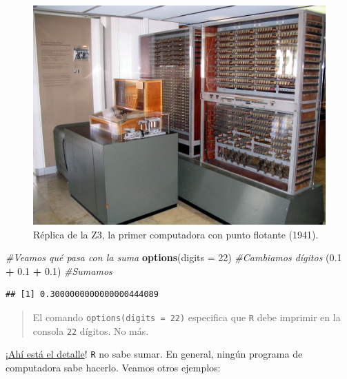 \documentclass[
]{book}
\newenvironment{Shaded}{\begin{snugshade}}{\end{snugshade}}
\newcommand{\CommentTok}[1]{\textcolor[rgb]{0.56,0.35,0.01}{\textit{#1}}}
\newcommand{\DataTypeTok}[1]{\textcolor[rgb]{0.13,0.29,0.53}{#1}}
\newcommand{\DecValTok}[1]{\textcolor[rgb]{0.00,0.00,0.81}{#1}}
\newcommand{\FloatTok}[1]{\textcolor[rgb]{0.00,0.00,0.81}{#1}}
\newcommand{\KeywordTok}[1]{\textcolor[rgb]{0.13,0.29,0.53}{\textbf{#1}}}
\newcommand{\NormalTok}[1]{#1}
\newcommand{\OperatorTok}[1]{\textcolor[rgb]{0.81,0.36,0.00}{\textbf{#1}}}
\newcommand{\StringTok}[1]{\textcolor[rgb]{0.31,0.60,0.02}{#1}}
\begin{document}
\begin{figure}

{\centering \includegraphics[width=22.22in]{images/Z3_Deutsches_Museum} 

}

\caption{Réplica de la Z3, la primer computadora con punto flotante (1941).}\label{fig:unnamed-chunk-58}
\end{figure}

\begin{Shaded}
\begin{Highlighting}[]
\CommentTok{#Veamos qué pasa con la suma}
\KeywordTok{options}\NormalTok{(}\DataTypeTok{digits =} \DecValTok{22}\NormalTok{) }\CommentTok{#Cambiamos dígitos}
\NormalTok{(}\FloatTok{0.1} \OperatorTok{+}\StringTok{ }\FloatTok{0.1} \OperatorTok{+}\StringTok{ }\FloatTok{0.1}\NormalTok{)    }\CommentTok{#Sumamos}
\end{Highlighting}
\end{Shaded}

\begin{verbatim}
## [1] 0.3000000000000000444089
\end{verbatim}

\begin{quote}
El comando \texttt{options(digits\ =\ 22)} especifica que \texttt{R} debe imprimir en la consola \texttt{22} dígitos. No más.
\end{quote}

¡\href{https://www.youtube.com/watch?v=1jaCpeXg-gg}{Ahí está el detalle}! \texttt{R} no sabe sumar. En general, ningún programa de computadora sabe hacerlo. Veamos otros ejemplos:
\end{document}
